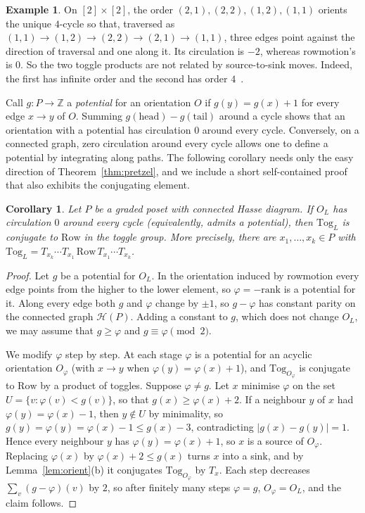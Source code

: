 \documentclass[11pt]{amsart}
\newtheorem{corollary}[theorem]{Corollary}
\theoremstyle{definition}
\newtheorem{example}[theorem]{Example}
\newcommand{\Tog}{\mathrm{Tog}}
\newcommand{\Row}{\mathrm{Row}}
\newcommand{\Hasse}{\mathcal H}
\begin{document}
\begin{example}\label{ex:square}
On $[2]\times[2]$, the order $(2,1),(2,2),(1,2),(1,1)$ orients the unique $4$-cycle so that, traversed as $(1,1)\to(1,2)\to(2,2)\to(2,1)\to(1,1)$, three edges point against the direction of traversal and one along it. Its circulation is $-2$, whereas rowmotion's is $0$. So the two toggle products are not related by source-to-sink moves. Indeed, the first has infinite order and the second has order $4$~\cite[Ex.~2.15]{GR1}.
\end{example}

Call $g:P\to\mathbb Z$ a \emph{potential} for an orientation $O$ if $g(y)=g(x)+1$ for every edge $x\to y$ of $O$. Summing $g(\text{head})-g(\text{tail})$ around a cycle shows that an orientation with a potential has circulation $0$ around every cycle. Conversely, on a connected graph, zero circulation around every cycle allows one to define a potential by integrating along paths. The following corollary needs only the easy direction of Theorem~\ref{thm:pretzel}, and we include a short self-contained proof that also exhibits the conjugating element.

\begin{corollary}\label{cor:pot}
Let $P$ be a graded poset with connected Hasse diagram. If $O_L$ has circulation $0$ around every cycle (equivalently, admits a potential), then $\Tog_L$ is conjugate to $\Row$ in the toggle group. More precisely, there are $x_1,\dots,x_k\in P$ with $\Tog_L=T_{x_k}\cdots T_{x_1}\,\Row\,T_{x_1}\cdots T_{x_k}$.
\end{corollary}

\begin{proof}
Let $g$ be a potential for $O_L$. In the orientation induced by rowmotion every edge points from the higher to the lower element, so $\varphi=-\mathrm{rank}$ is a potential for it. Along every edge both $g$ and $\varphi$ change by $\pm1$, so $g-\varphi$ has constant parity on the connected graph $\Hasse(P)$. Adding a constant to $g$, which does not change $O_L$, we may assume that $g\ge\varphi$ and $g\equiv\varphi\pmod2$.

We modify $\varphi$ step by step. At each stage $\varphi$ is a potential for an acyclic orientation $O_\varphi$ (with $x\to y$ when $\varphi(y)=\varphi(x)+1$), and $\Tog_{O_\varphi}$ is conjugate to $\Row$ by a product of toggles. Suppose $\varphi\ne g$. Let $x$ minimise $\varphi$ on the set $U=\{v:\varphi(v)<g(v)\}$, so that $g(x)\ge\varphi(x)+2$. If a neighbour $y$ of $x$ had $\varphi(y)=\varphi(x)-1$, then $y\notin U$ by minimality, so $g(y)=\varphi(y)=\varphi(x)-1\le g(x)-3$, contradicting $|g(x)-g(y)|=1$. Hence every neighbour $y$ has $\varphi(y)=\varphi(x)+1$, so $x$ is a source of $O_\varphi$. Replacing $\varphi(x)$ by $\varphi(x)+2\le g(x)$ turns $x$ into a sink, and by Lemma~\ref{lem:orient}(b) it conjugates $\Tog_{O_\varphi}$ by $T_x$. Each step decreases $\sum_v(g-\varphi)(v)$ by $2$, so after finitely many steps $\varphi=g$, $O_\varphi=O_L$, and the claim follows.
\end{proof}
\end{document}
